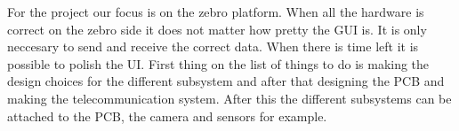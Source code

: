\documentclass{article}
\begin{document}
For the project our focus is on the zebro platform. When all the hardware is correct on the zebro side it does not matter how pretty the GUI is. It is only neccesary to send and receive the correct data. When there is time left it is possible to polish the UI. First thing on the list of things to do is making the design choices for the different subsystem and after that designing the PCB and making the telecommunication system. After this the different subsystems can be attached to the PCB, the camera and sensors for example.
\end{document}
